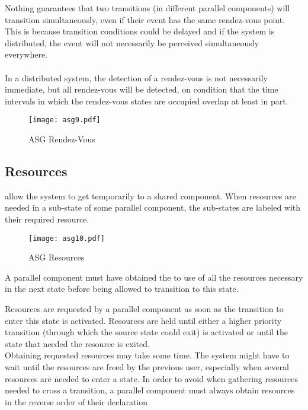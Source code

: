 \documentclass[../main.tex]{subfiles}
\begin{document}
Nothing guarantees that two transitions (in different parallel components) will transition simultaneously, even if their event has the same rendez-vous point.
This is because transition conditions could be delayed and if the system is distributed, the event will not necessarily be perceived simultaneously everywhere.
\\\\
In a distributed system, the detection of a rendez-vous is not necessarily immediate, but all rendez-vous will be detected, on condition that the time intervals in which the rendez-vous states are occupied overlap at least in part.
\begin{figure}[H]
    \centering
    \texttt{[image: asg9.pdf]}
    \caption{ASG Rendez-Vous}
    \label{asg9}
\end{figure}

\subsection{Resources}
 allow the system to get temporarily  to a shared component. When resources are needed in a sub-state of some parallel component, the sub-states are labeled with their required resource.


\begin{figure}[H]
    \centering
    \texttt{[image: asg10.pdf]}
    \caption{ASG Resources}
    \label{asg10}
\end{figure}
A parallel component must have obtained the  to use of all the resources necessary in the next state before being allowed to transition to this state.

Resources are requested by a parallel component as soon as the transition to enter this state is activated.
Resources are held until either a higher priority transition (through which the source state could exit) is activated or until the state that needed the resource is exited.
\\
Obtaining requested resources may take some time.
The system might have to wait until the resources are freed by the previous user, especially when several resources are needed to enter a state.
In order to avoid  when gathering resources needed to cross a transition, a parallel component must always obtain resources in the reverse order of their declaration
\end{document}
